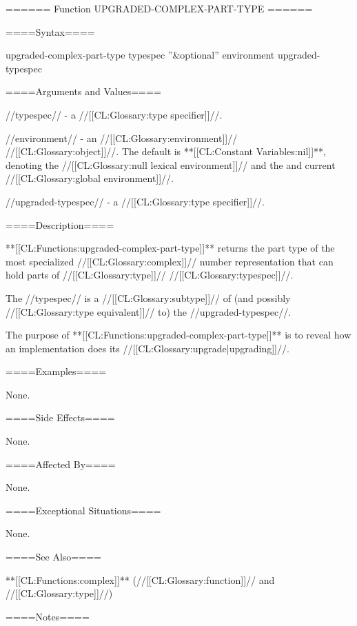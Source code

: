 ====== Function UPGRADED-COMPLEX-PART-TYPE ======

====Syntax====

\DefunWithValues upgraded-complex-part-type {typespec ''&optional'' environment} {upgraded-typespec}

====Arguments and Values====

//typespec// - a //[[CL:Glossary:type specifier]]//.

//environment// - an //[[CL:Glossary:environment]]// //[[CL:Glossary:object]]//. The default is **[[CL:Constant Variables:nil]]**, denoting the //[[CL:Glossary:null lexical environment]]// and the and current //[[CL:Glossary:global environment]]//.

//upgraded-typespec// - a //[[CL:Glossary:type specifier]]//.

====Description====

**[[CL:Functions:upgraded-complex-part-type]]** returns the part type of the most specialized //[[CL:Glossary:complex]]// number representation that can hold parts of //[[CL:Glossary:type]]// //[[CL:Glossary:typespec]]//.

The //typespec// is a //[[CL:Glossary:subtype]]// of (and possibly //[[CL:Glossary:type equivalent]]// to) the //upgraded-typespec//.

The purpose of **[[CL:Functions:upgraded-complex-part-type]]** is to reveal how an implementation does its //[[CL:Glossary:upgrade|upgrading]]//.

====Examples====

None.

====Side Effects====

None.

====Affected By====

None.

====Exceptional Situations====

None.

====See Also====

**[[CL:Functions:complex]]** (//[[CL:Glossary:function]]// and //[[CL:Glossary:type]]//)

====Notes====

 
